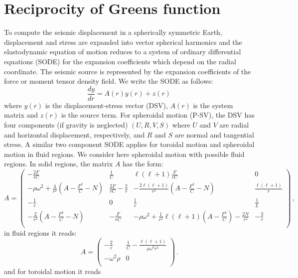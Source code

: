 \documentclass[11pt,a4paper]{article}
\begin{document}
\section{Reciprocity of Greens function}
%
To compute the seismic displacement in a spherically symmetric Earth, displacement and stress are expanded into vector spherical harmonics and the elastodynamic equation of motion reduces to a system of ordinary differential equations (SODE) for the expansion coefficients which depend on the radial coordinate. The seismic source is represented by the expansion coefficients of the force or moment tensor density field. We write the SODE as follows:
%
\begin{equation}
\frac{dy}{dr}=A(r)y(r)+z(r) \,
\end{equation}
%
where $y(r)$ is the displacement-stress vector (DSV), $A(r)$ is the system matrix and $z(r)$ is the source term. For spheroidal motion (P-SV), the DSV has four components (if gravity is neglected) $(U,R,V,S)$ where $U$ and $V$ are radial and horizontal displacement, respectively, and $R$ and $S$ are normal and tangential stress. A similar two component SODE applies for toroidal motion and spheroidal motion in fluid regions. We consider here spheroidal motion with possible fluid regions. In solid regions, the matrix $A$ has the form:
%
\begin{equation}
A = \left(\begin{array}{cccc}
-\frac{2F}{rC} & \frac{1}{C} & \ell(\ell+1)\frac{F}{rC} & 0 \\
-\rho\omega^2+\frac{4}{r^2}(A-\frac{F^2}{C}-N) & \frac{2F}{rC}-\frac{2}{r} & -\frac{2\ell(\ell+1)}{r^2}(A-\frac{F^2}{C}-N) & \frac{\ell(\ell+1)}{r} \\
-\frac{1}{r} & 0 & \frac{1}{r} & \frac{1}{L} \\
-\frac{2}{r^2}(A-\frac{F^2}{C}-N) & -\frac{F}{rC} & -\rho\omega^2+\frac{1}{r^2}\ell(\ell+1)(A-\frac{F^2}{C})-\frac{2N}{r^2} & -\frac{3}{r} \\
\end{array}\right) \,,
\end{equation}
%
in fluid regions it reads:
%
\begin{equation}
A = \left(\begin{array}{cccc}
-\frac{2}{r} & \frac{1}{C}-\frac{\ell(\ell+1)}{\rho\omega^2 r^2} \\
-\omega^2\rho & 0 \\
\end{array}\right) \,.
\end{equation}
%
and for toroidal motion it reads
\end{document}
